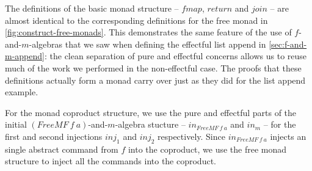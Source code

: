 \documentclass{jfp1}
\begin{document}
The definitions of the basic monad structure -- $\mathit{fmap}$,
$\mathit{return}$ and $\mathit{join}$ -- are almost identical to the
corresponding definitions for the free monad in
\autoref{fig:construct-free-monads}. This demonstrates the same
feature of the use of $f$-and-$m$-algebras that we saw when defining
the effectful list append in \autoref{sec:f-and-m-append}: the clean
separation of pure and effectful concerns allows us to reuse much of
the work we performed in the non-effectful case. The proofs that these
definitions actually form a monad carry over just as they did for the
list append example.

For the monad coproduct structure, we use the pure and effectful parts
of the initial $(\mathit{FreeMF}~f~a)$-and-$m$-algebra stucture --
$\mathit{in}_{\mathit{FreeMF}~f~a}$ and $\mathit{in}_m$ -- for the
first and second injections $\mathit{inj}_1$ and $\mathit{inj}_2$
respectively. Since $\mathit{in}_{\mathit{FreeMF}~f~a}$ injects an
single abstract command from $f$ into the coproduct, we use the free
monad structure to inject all the commands into the coproduct.
\end{document}

